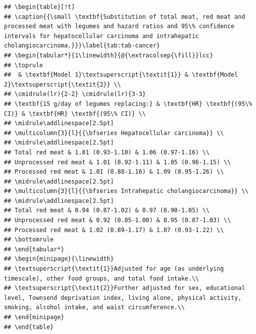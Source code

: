 \documentclass[sn-basic,Numbered,iicol,pdflatex]{sn-jnl}
\begin{document}
\begin{appendices}
\begin{verbatim}
## \begin{table}[!t]
## \caption{{\small \textbf{Substitution of total meat, red meat and processed meat with legumes and hazard ratios and 95\% confidence intervals for hepatocellular carcinoma and intrahepatic cholangiocarcinoma.}}}\label{tab:tab-cancer}
## \begin{tabular*}{1\linewidth}{@{\extracolsep{\fill}}lcc}
## \toprule
##  & \textbf{Model 1}\textsuperscript{\textit{1}} & \textbf{Model 2}\textsuperscript{\textit{2}} \\
## \cmidrule(lr){2-2} \cmidrule(lr){3-3}
## \textbf{15 g/day of legumes replacing:} & \textbf{HR} \textbf{(95\% CI)} & \textbf{HR} \textbf{(95\% CI)} \\
## \midrule\addlinespace[2.5pt]
## \multicolumn{3}{l}{{\bfseries Hepatocellular carcinoma}} \\
## \midrule\addlinespace[2.5pt]
## Total red meat & 1.01 (0.93-1.10) & 1.06 (0.97-1.16) \\
## Unprocessed red meat & 1.01 (0.92-1.11) & 1.05 (0.96-1.15) \\
## Processed red meat & 1.01 (0.88-1.16) & 1.09 (0.95-1.26) \\
## \midrule\addlinespace[2.5pt]
## \multicolumn{3}{l}{{\bfseries Intrahepatic cholangiocarcinoma}} \\
## \midrule\addlinespace[2.5pt]
## Total red meat & 0.94 (0.87-1.02) & 0.97 (0.90-1.05) \\
## Unprocessed red meat & 0.92 (0.85-1.00) & 0.95 (0.87-1.03) \\
## Processed red meat & 1.02 (0.89-1.17) & 1.07 (0.93-1.22) \\
## \bottomrule
## \end{tabular*}
## \begin{minipage}{\linewidth}
## \textsuperscript{\textit{1}}Adjusted for age (as underlying timescale), other food groups, and total food intake.\\
## \textsuperscript{\textit{2}}Further adjusted for sex, educational level, Townsend deprivation index, living alone, physical activity, smoking, alcohol intake, and waist circumference.\\
## \end{minipage}
## \end{table}
\end{verbatim}

\end{appendices}

\clearpage


\end{document}
